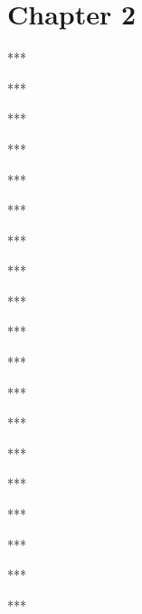 \newpage
\section{Chapter 2}

\begin{problem} ***
\end{problem}
\begin{problem} ***
\end{problem}
\begin{problem} ***
\end{problem}
\begin{problem} ***
\end{problem}
\begin{problem} ***
\end{problem}
\begin{problem} ***
\end{problem}
\begin{problem} ***
\end{problem}
\begin{problem} ***
\end{problem}
\begin{problem} ***
\end{problem}
\begin{problem} ***
\end{problem}
\begin{problem} ***
\end{problem}
\begin{problem} ***
\end{problem}
\begin{problem} ***
\end{problem}
\begin{problem} ***
\end{problem}
\begin{problem} ***
\end{problem}
\begin{problem} ***
\end{problem}
\begin{problem} ***
\end{problem}
\begin{problem} ***
\end{problem}
\begin{problem} ***
\end{problem}